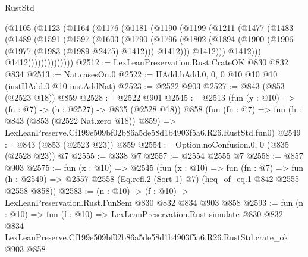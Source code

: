 \begin{lexlean}{RustStd}
\begin{coremodule}
            (@1105
              (@1123
                (@1164
                  (@1176
                    (@1181
                      (@1190
                        (@1199
                          (@1211
                            (@1477
                              (@1483
                                (@1489
                                  (@1591
                                    (@1597
                                      (@1603
                                        (@1790
                                          (@1796
                                            (@1802
                                              (@1894
                                                (@1900
                                                  (@1906 (@1977 (@1983 (@1989 @2475) @1412)))
                                                  @1412)))
                                            @1412)))
                                      @1412)))
                                @1412))))))))))))))
@2512 := LexLeanPreservation.Rust.CrateOK @830 @832 @834
@2513 := Nat.casesOn.{0}
@2522 := HAdd.hAdd.{0, 0, 0} @10 @10 @10 (instHAdd.{0} @10 instAddNat)
@2523 := @2522 @903
@2527 := @843 (@853 (@2523 @18)) @859
@2528 := @2522 @901
@2545 := @2513
    (fun (y : @10) => (fn : @7) -> (h : @2527) -> @835 (@2528 @18))
    @858
    (fun (fn : @7) =>
    fun (h : @843 (@853 (@2522 Nat.zero @18)) @859) =>
    LexLeanPreserve.Cf199e509bf02b86a5de58d1b4903f5a6.R26.RustStd.fun0)
@2549 := @843 (@853 (@2523 @23)) @859
@2554 := Option.noConfusion.{0, 0} (@835 (@2528 @23)) @7
@2555 := @338 @7
@2557 := @2554 @2555 @7
@2558 := @857 @903
@2575 := fun (x : @10) =>
  @2545
    (fun (x : @10) =>
    fun (fn : @7) =>
    fun (h : @2549) => @2557 @2558 (Eq.refl.{2} (Sort 1) @7) (heq_of_eq.{1} @842 @2555 @2558 @858))
@2583 := (n : @10) -> (f : @10) -> LexLeanPreservation.Rust.FunSem @830 @832 @834 @903 @858
@2593 := fun (n : @10) =>
  fun (f : @10) =>
  LexLeanPreservation.Rust.simulate
    @830
    @832
    @834
    LexLeanPreserve.Cf199e509bf02b86a5de58d1b4903f5a6.R26.RustStd.crate_ok
    @903
    @858
\end{coremodule}
\end{lexlean}
